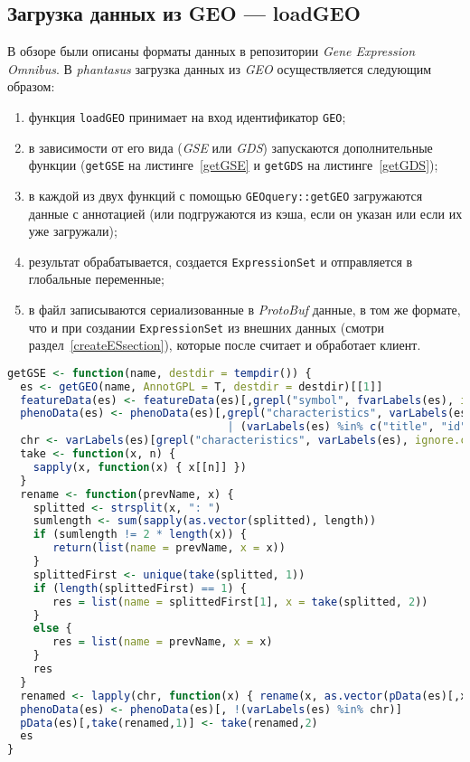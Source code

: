 \subsection{Загрузка данных из GEO --- loadGEO}
В обзоре были описаны форматы данных в репозитории \emph{Gene Expression Omnibus}.
В \emph{phantasus} загрузка данных из \emph{GEO} осуществляется следующим образом:
\begin{enumerate}
\item функция \texttt{loadGEO} принимает на вход идентификатор \texttt{GEO};
\item в зависимости от его вида (\emph{GSE} или \emph{GDS}) запускаются дополнительные функции (\texttt{getGSE} на листинге~\ref{getGSE} и \texttt{getGDS} на листинге~\ref{getGDS});
\item в каждой из двух функций с помощью \texttt{GEOquery::getGEO} загружаются данные с аннотацией (или подгружаются из кэша, если он указан или если их уже загружали);
\item результат обрабатывается, создается \texttt{ExpressionSet} и отправляется в глобальные переменные;
\item в файл записываются сериализованные в \emph{ProtoBuf} данные, в том же формате, что и при создании \texttt{ExpressionSet} из внешних данных (смотри раздел~\ref{createESsection}), которые после считает и обработает клиент.
\end{enumerate}
\begin{lstlisting}[float=!h,caption={Загрузка данных типа GSE из Gene Expression Omnibus},label={getGSE},language=R]
getGSE <- function(name, destdir = tempdir()) {
  es <- getGEO(name, AnnotGPL = T, destdir = destdir)[[1]]
  featureData(es) <- featureData(es)[,grepl("symbol", fvarLabels(es), ignore.case = T)]
  phenoData(es) <- phenoData(es)[,grepl("characteristics", varLabels(es), ignore.case = T)
                                  | (varLabels(es) %in% c("title", "id", "geo_accession"))]
  chr <- varLabels(es)[grepl("characteristics", varLabels(es), ignore.case = T)]
  take <- function(x, n) {
    sapply(x, function(x) { x[[n]] })
  }
  rename <- function(prevName, x) {
    splitted <- strsplit(x, ": ")
    sumlength <- sum(sapply(as.vector(splitted), length))
    if (sumlength != 2 * length(x)) {
       return(list(name = prevName, x = x))
    }
    splittedFirst <- unique(take(splitted, 1))
    if (length(splittedFirst) == 1) {
       res = list(name = splittedFirst[1], x = take(splitted, 2))
    }
    else {
       res = list(name = prevName, x = x)
    }
    res
  }
  renamed <- lapply(chr, function(x) { rename(x, as.vector(pData(es)[,x])) })
  phenoData(es) <- phenoData(es)[, !(varLabels(es) %in% chr)]
  pData(es)[,take(renamed,1)] <- take(renamed,2)
  es
}
\end{lstlisting}

